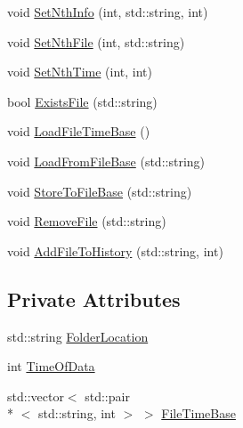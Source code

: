 \begin{DoxyCompactItemize}
void \hyperlink{classFileHistory_a433153884b5c84c40cf09e9dc0783a7d}{Set\-Nth\-Info} (int, std\-::string, int)
\item 
void \hyperlink{classFileHistory_a231ec4de86666d32c332ccd8b129007d}{Set\-Nth\-File} (int, std\-::string)
\item 
void \hyperlink{classFileHistory_a34e0887629722064f1e077cf7ceff7aa}{Set\-Nth\-Time} (int, int)
\item 
bool \hyperlink{classFileHistory_ad813c8ee0e890ee7ab12eaac763cc877}{Exists\-File} (std\-::string)
\item 
void \hyperlink{classFileHistory_a352c832218a7912402142e80a6563233}{Load\-File\-Time\-Base} ()
\item 
void \hyperlink{classFileHistory_a0e797c6bfddd9a9ac2ef73ca2ccf5ea3}{Load\-From\-File\-Base} (std\-::string)
\item 
void \hyperlink{classFileHistory_aa51ad2b7dfd56927ae83f8abbd2fdbc1}{Store\-To\-File\-Base} (std\-::string)
\item 
void \hyperlink{classFileHistory_a527def32d2975b887a53bf428040021b}{Remove\-File} (std\-::string)
\item 
void \hyperlink{classFileHistory_acb6c4655ce7ba2a2911efdd4d8b4c0b8}{Add\-File\-To\-History} (std\-::string, int)
\end{DoxyCompactItemize}
\subsection*{Private Attributes}
\begin{DoxyCompactItemize}
\item 
std\-::string \hyperlink{classFileHistory_a4ed9b51579a45e657ba6e1dbb4d2e7a7}{Folder\-Location}
\item 
int \hyperlink{classFileHistory_ac054d9b23889c2d64faebfbb67bcf444}{Time\-Of\-Data}
\item 
std\-::vector$<$ std\-::pair\\*
$<$ std\-::string, int $>$ $>$ \hyperlink{classFileHistory_ac4ce01b2c30fedd241d93107f34c3750}{File\-Time\-Base}
\end{DoxyCompactItemize}


